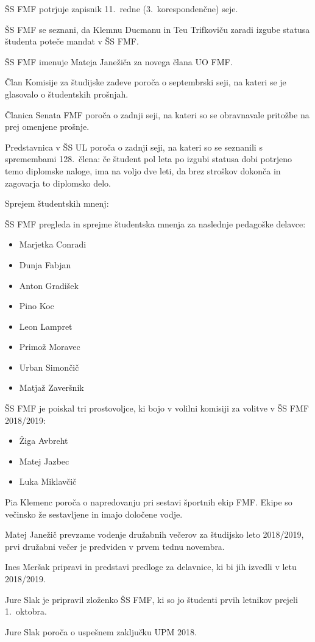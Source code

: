 \documentclass{seja}
\begin{document}
\begin{ad}
  \item
  \begin{sklep*}
    ŠS FMF potrjuje zapisnik 11.~redne (3.~korespondenčne) seje.
  \end{sklep*}
  \item
  ŠS FMF se seznani, da Klemnu Ducmanu in Teu Trifkoviču zaradi izgube statusa študenta poteče mandat v ŠS FMF.
  \begin{sklep*}
    ŠS FMF imenuje Mateja Janežiča za novega člana UO FMF.
  \end{sklep*}
  \item
  Član Komisije za študijske zadeve poroča o septembrski seji, na kateri se je glasovalo o študentskih prošnjah.

  Članica Senata FMF poroča o zadnji seji, na kateri so se obravnavale pritožbe na prej omenjene prošnje.

  Predstavnica v ŠS UL poroča o zadnji seji, na kateri so se seznanili s spremembami 128.~člena: če študent pol leta po izgubi statusa dobi potrjeno temo diplomske naloge, ima na voljo dve leti, da brez stroškov dokonča in zagovarja to diplomsko delo.
  \item
  Sprejem študentskih mnenj:
  \begin{sklep*}
    ŠS FMF pregleda in sprejme študentska mnenja za naslednje pedagoške delavce:
    \begin{itemize}
      \item Marjetka Conradi
      \item Dunja Fabjan
      \item Anton Gradišek
      \item Pino Koc
      \item Leon Lampret
      \item Primož Moravec
      \item Urban Simončič
      \item Matjaž Zaveršnik
    \end{itemize}
  \end{sklep*}
  \item
  ŠS FMF je poiskal tri prostovoljce, ki bojo v volilni komisiji za volitve v ŠS FMF 2018/2019:
  \begin{itemize}
    \item Žiga Avbreht
    \item Matej Jazbec
    \item Luka Miklavčič
  \end{itemize}
  \item
  Pia Klemenc poroča o napredovanju pri sestavi športnih ekip FMF. Ekipe so večinsko že sestavljene in imajo določene vodje.
  \item
  Matej Janežič prevzame vodenje družabnih večerov za študijsko leto 2018/2019, prvi družabni večer je predviden v prvem tednu novembra.
  \item
  Ines Meršak pripravi in predstavi predloge za delavnice, ki bi jih izvedli v letu 2018/2019.

  Jure Slak je pripravil zloženko ŠS FMF, ki so jo študenti prvih letnikov prejeli 1.~oktobra.

  Jure Slak poroča o uspešnem zaključku UPM 2018.
\end{ad}
\end{document}
